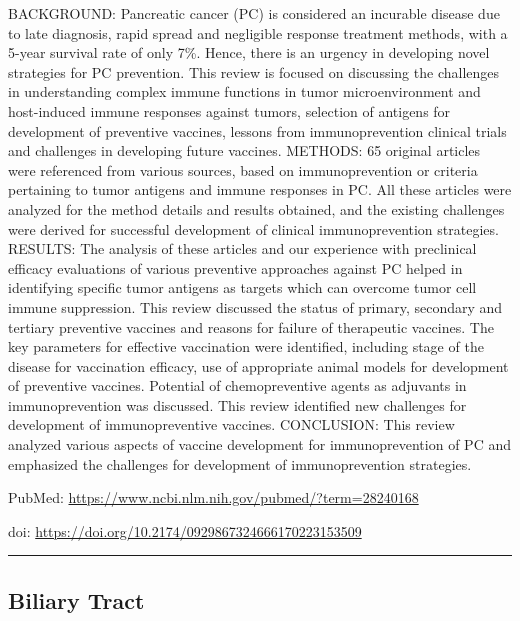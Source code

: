 \documentclass[]{article}
\begin{document}
BACKGROUND: Pancreatic cancer (PC) is considered an incurable disease
due to late diagnosis, rapid spread and negligible response treatment
methods, with a 5-year survival rate of only 7\%. Hence, there is an
urgency in developing novel strategies for PC prevention. This review is
focused on discussing the challenges in understanding complex immune
functions in tumor microenvironment and host-induced immune responses
against tumors, selection of antigens for development of preventive
vaccines, lessons from immunoprevention clinical trials and challenges
in developing future vaccines. METHODS: 65 original articles were
referenced from various sources, based on immunoprevention or criteria
pertaining to tumor antigens and immune responses in PC. All these
articles were analyzed for the method details and results obtained, and
the existing challenges were derived for successful development of
clinical immunoprevention strategies. RESULTS: The analysis of these
articles and our experience with preclinical efficacy evaluations of
various preventive approaches against PC helped in identifying specific
tumor antigens as targets which can overcome tumor cell immune
suppression. This review discussed the status of primary, secondary and
tertiary preventive vaccines and reasons for failure of therapeutic
vaccines. The key parameters for effective vaccination were identified,
including stage of the disease for vaccination efficacy, use of
appropriate animal models for development of preventive vaccines.
Potential of chemopreventive agents as adjuvants in immunoprevention was
discussed. This review identified new challenges for development of
immunopreventive vaccines. CONCLUSION: This review analyzed various
aspects of vaccine development for immunoprevention of PC and emphasized
the challenges for development of immunoprevention strategies.

PubMed: \url{https://www.ncbi.nlm.nih.gov/pubmed/?term=28240168}

doi: \url{https://doi.org/10.2174/0929867324666170223153509}

{}

{}

\begin{center}\rule{0.5\linewidth}{\linethickness}\end{center}

\hypertarget{biliary-tract}{%
\subsection{Biliary Tract}\label{biliary-tract}}
\end{document}
